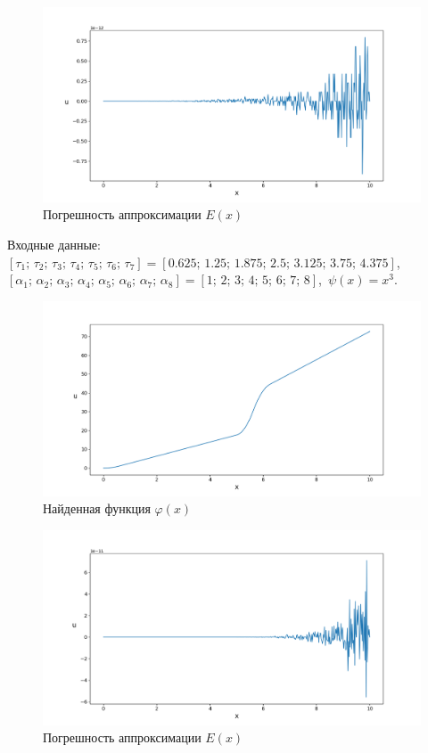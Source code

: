\documentclass{article}
\theoremstyle{definition}
\begin{document}
\begin{figure}[H]
	\centering
	\includegraphics[trim={2.175cm, 0, 0, 1.5cm}, clip, scale=0.618]{8_E.png}
	\caption{Погрешность аппроксимации $E(x)$}
	\label{fig:image24}
\end{figure}

Входные данные: \\
$[\tau_1;\, \tau_2;\, \tau_3;\, \tau_4;\, \tau_5;\, \tau_6;\, \tau_7] = 
[0.625;\, 1.25;\, 1.875;\, 2.5;\, 3.125;\, 3.75;\, 4.375]$, \\[1mm]
$[\alpha_1;\, \alpha_2;\, \alpha_3;\, \alpha_4;\, \alpha_5;\, \alpha_6;\, \alpha_7;\, \alpha_8] = 
[1;\, 2;\, 3;\, 4;\, 5;\, 6;\, 7;\, 8]$, 
$\,\psi(x) = x^3$.
\begin{figure}[H]
	\centering
	\includegraphics[trim={2.175cm, 0, 0, 1.5cm}, clip, scale=0.618]{9_u0.png}
	\caption{Найденная функция $\varphi(x)$}
	\label{fig:image25}
\end{figure}

\begin{figure}[H]
	\centering
	\includegraphics[trim={2.175cm, 0, 0, 1.5cm}, clip, scale=0.618]{9_E.png}
	\caption{Погрешность аппроксимации $E(x)$}
	\label{fig:image26}
\end{figure}
\end{document}
